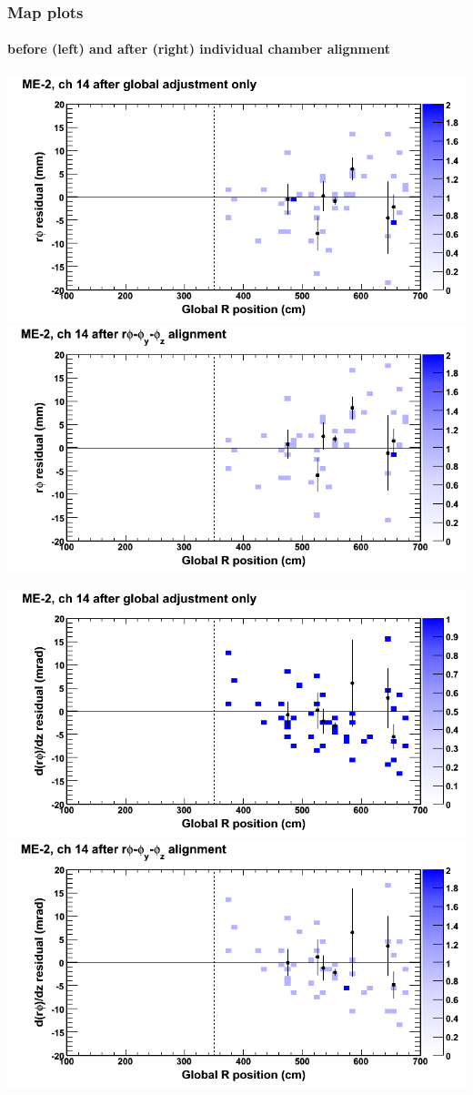 \documentclass[compress]{beamer}
\begin{document}
\begin{frame}
\frametitle{Map plots}
\framesubtitle{before (left) and after (right) individual chamber alignment}
\includegraphics[width=0.5\linewidth]{ringmapplots_3dof/before_CSCvsr_mem2ch14_x.png} \includegraphics[width=0.5\linewidth]{ringmapplots_3dof/after_CSCvsr_mem2ch14_x.png}

\includegraphics[width=0.5\linewidth]{ringmapplots_3dof/before_CSCvsr_mem2ch14_dxdz.png} \includegraphics[width=0.5\linewidth]{ringmapplots_3dof/after_CSCvsr_mem2ch14_dxdz.png}
\end{frame}
\end{document}
